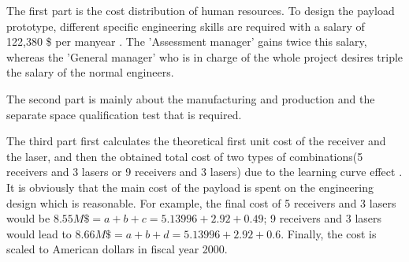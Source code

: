 The first part is the cost distribution of human resources. To design the payload prototype, different specific engineering skills are required with a salary of 122,380 \$ per manyear \cite{engineering_salary}. The 'Assessment manager' gains twice this salary, whereas the 'General manager' who is in charge of the whole project desires triple the salary of the normal engineers.

The second part is mainly about the manufacturing and production and the separate space qualification test that is required.

The third part first calculates the theoretical first unit cost of the receiver and the \acs{laser}, and then the obtained total cost of two types of combinations(5 receivers and 3 \acsp{laser} or 9 receivers and 3 \acsp{laser}) due to the learning curve effect \cite{Space2B}. It is obviously that the main cost of the payload is spent on the engineering design which is reasonable. For example, the final cost of 5 receivers and 3 \acsp{laser} would be $8.55 M\$ = a + b + c = 5.13996 + 2.92 + 0.49$; 9 receivers and 3 \acsp{laser} would lead to $8.66 M\$ = a + b + d = 5.13996 + 2.92 + 0.6$. Finally, the cost is scaled to American dollars in fiscal year 2000.

